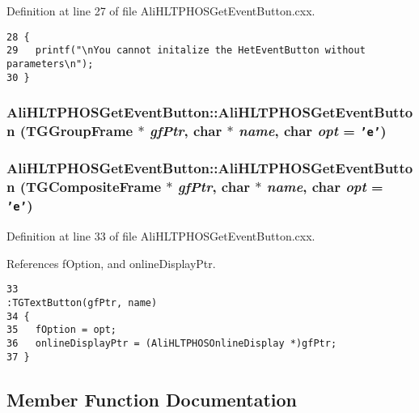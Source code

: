 Definition at line 27 of file Ali\-HLTPHOSGet\-Event\-Button.cxx.

\footnotesize\begin{verbatim}28 {
29   printf("\nYou cannot initalize the HetEventButton without parameters\n");
30 }
\end{verbatim}\normalsize 


\subsubsection{\setlength{\rightskip}{0pt plus 5cm}Ali\-HLTPHOSGet\-Event\-Button::Ali\-HLTPHOSGet\-Event\-Button (TGGroup\-Frame $\ast$ {\em gf\-Ptr}, char $\ast$ {\em name}, char {\em opt} = {\tt 'e'})}\label{classAliHLTPHOSGetEventButton_a1}


\subsubsection{\setlength{\rightskip}{0pt plus 5cm}Ali\-HLTPHOSGet\-Event\-Button::Ali\-HLTPHOSGet\-Event\-Button (TGComposite\-Frame $\ast$ {\em gf\-Ptr}, char $\ast$ {\em name}, char {\em opt} = {\tt 'e'})}\label{classAliHLTPHOSGetEventButton_a2}




Definition at line 33 of file Ali\-HLTPHOSGet\-Event\-Button.cxx.

References f\-Option, and online\-Display\-Ptr.

\footnotesize\begin{verbatim}33                                                                                                :TGTextButton(gfPtr, name)
34 {
35   fOption = opt;
36   onlineDisplayPtr = (AliHLTPHOSOnlineDisplay *)gfPtr;
37 }
\end{verbatim}\normalsize 




\subsection{Member Function Documentation}
